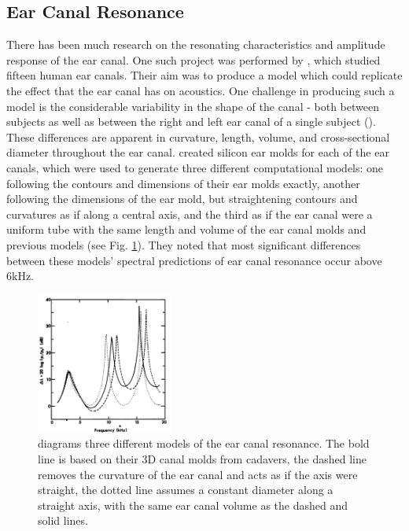 \subsection{Ear Canal Resonance}
There has been much research on the resonating characteristics and amplitude response of the ear canal.  One such project was performed by \cite{stinson:89}, which studied fifteen human ear canals.  Their aim was to produce a model which could replicate the effect that the ear canal has on acoustics.
One challenge in producing such a model is the considerable variability in the shape of the canal - both between subjects as well as between the right and left ear canal of a single subject (\cite{stinson:89}).  These differences are apparent in curvature, length, volume, and cross-sectional diameter throughout the ear canal.  \cite{stinson:89} created silicon ear molds for each of the ear canals, which were used to generate three different computational models: one following the contours and dimensions of their ear molds exactly, another following the dimensions of the ear mold, but straightening contours and curvatures as if along a central axis, and the third as if the ear canal were a uniform tube with the same length and volume of the ear canal molds and previous models (see Fig. \ref{fig:eac_modelling}).  They noted that most significant differences between these models' spectral predictions of ear canal resonance occur above 6kHz.

%
\begin{figure}[h!]
\centering
  \includegraphics[width=0.4\textwidth]{figure/eac_mod_diffs.png}
  \caption{\cite{stinson:89} diagrams three different models of the ear canal resonance.  The bold line is based on their 3D canal molds from cadavers, the dashed line removes the curvature of the ear canal and acts as if the axis were straight, the dotted line assumes a constant diameter along a straight axis, with the same ear canal volume as the dashed and solid lines.}
  \label{fig:eac_modelling}
\end{figure}
%

